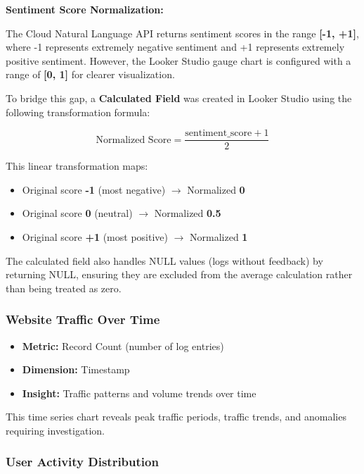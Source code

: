 \documentclass[12pt,a4paper]{article}
\begin{document}
\textbf{Sentiment Score Normalization:}

The Cloud Natural Language API returns sentiment scores in the range \textbf{[-1, +1]}, where -1 represents extremely negative sentiment and +1 represents extremely positive sentiment. However, the Looker Studio gauge chart is configured with a range of \textbf{[0, 1]} for clearer visualization.

To bridge this gap, a \textbf{Calculated Field} was created in Looker Studio using the following transformation formula:

\begin{equation}
\text{Normalized Score} = \frac{\text{sentiment\_score} + 1}{2}
\end{equation}

This linear transformation maps:
\begin{itemize}
    \item Original score \textbf{-1} (most negative) $\rightarrow$ Normalized \textbf{0}
    \item Original score \textbf{0} (neutral) $\rightarrow$ Normalized \textbf{0.5}
    \item Original score \textbf{+1} (most positive) $\rightarrow$ Normalized \textbf{1}
\end{itemize}

The calculated field also handles NULL values (logs without feedback) by returning NULL, ensuring they are excluded from the average calculation rather than being treated as zero.

\subsubsection{Website Traffic Over Time}

\begin{itemize}
    \item \textbf{Metric:} Record Count (number of log entries)
    \item \textbf{Dimension:} Timestamp
    \item \textbf{Insight:} Traffic patterns and volume trends over time
\end{itemize}

This time series chart reveals peak traffic periods, traffic trends, and anomalies requiring investigation.

\subsubsection{User Activity Distribution}
\end{document}
